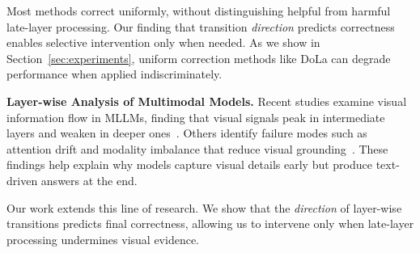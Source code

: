 Most methods correct uniformly, without distinguishing helpful from harmful late-layer processing. Our finding that transition \emph{direction} predicts correctness enables selective intervention only when needed. As we show in Section~\ref{sec:experiments}, uniform correction methods like DoLa can degrade performance when applied indiscriminately.

\textbf{Layer-wise Analysis of Multimodal Models.} Recent studies examine visual information flow in MLLMs, finding that visual signals peak in intermediate layers and weaken in deeper ones~\cite{wang2024valid,knoweledge_evolve2025,yin2025lifting}. Others identify failure modes such as attention drift and modality imbalance that reduce visual grounding~\cite{jiang2025devils,chen2025multimodal}. These findings help explain why models capture visual details early but produce text-driven answers at the end.

Our work extends this line of research. We show that the \emph{direction} of layer-wise transitions predicts final correctness, allowing us to intervene only when late-layer processing undermines visual evidence.
